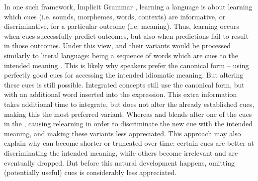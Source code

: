 \documentclass[output=paper
,modfonts
,nonflat]{langsci/langscibook}
\begin{document}
In one such framework, Implicit Grammar \citep{BaayenRamscar2015}, learning a language is about learning which cues (i.e. sounds, morphemes, words, contexts) are informative, or discriminative, for a particular outcome (i.e. meaning). Thus, learning occurs when cues successfully predict outcomes, but also when predictions  fail to result in those outcomes. Under this view,  and their variants  would be processed  similarly to literal  language: being a sequence of words which are cues to the intended meaning \citep[cf.][]{GeeraertEtAl2017}. This is likely why speakers prefer the canonical form -- using perfectly good cues for accessing the intended idiomatic meaning. But altering these cues is still possible. Integrated concepts  still use the canonical form, but with an additional word inserted into the expression. This extra information takes additional time to integrate, but does not alter the already established cues, making this the most preferred variant. Whereas  and  blends  alter one of the cues in the , causing relearning in order to discriminate the new cue with the intended meaning, and making these variants less appreciated. This approach may also explain why  can become shorter or truncated  over time: certain cues are better at discriminating the intended meaning, while others become irrelevant and are eventually dropped. But before this natural development happens, omitting (potentially useful) cues is considerably less appreciated. 




\end{document}
